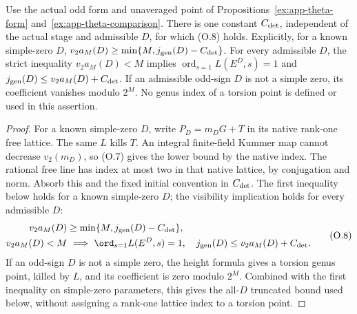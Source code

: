 \begin{proposition}\label{ex:app-visibility}
Use the actual odd form and unaveraged point of
Propositions~\ref{ex:app-theta-form} and~\ref{ex:app-theta-comparison}.
There is one constant $C_{\rm det}$, independent of the actual stage
and admissible $D$, for which (O.8) holds. Explicitly, for a known
simple-zero $D$,
$v_2a_M(D)\ge\min\{M,j_{\rm gen}(D)-C_{\rm det}\}$.
For every admissible $D$, the strict inequality $v_2a_M(D)<M$
implies $\operatorname{ord}_{s=1}L(E^D,s)=1$ and
$j_{\rm gen}(D)\le v_2a_M(D)+C_{\rm det}$.
If an admissible odd-sign $D$ is not a simple zero, its coefficient
vanishes modulo $2^M$. No genus index of a torsion point is defined
or used in this assertion.
\end{proposition}
\begin{proof}\leavevmode
For a known simple-zero $D$, write $P_D=m_DG+T$ in its native
rank-one free lattice. The same $L$ kills $T$.
An integral finite-field Kummer map cannot decrease
$v_2(m_D)$, so (O.7) gives the lower bound by the native index.
The rational free line has index at most two in that native
lattice, by conjugation and norm. Absorb this and the fixed
initial convention in $C_{\rm det}$. The first inequality below
holds for a known simple-zero $D$; the visibility implication holds
for every admissible $D$:
\[
 \begin{split}
 v_2a_M(D)&\ge\min\{M,j_{\rm gen}(D)-C_{\rm det}\},\\
 v_2a_M(D)<M&\ \Longrightarrow\
  \ord_{s=1}L(E^D,s)=1,\quad
       j_{\rm gen}(D)\le v_2a_M(D)+C_{\rm det}.
 \end{split}                                                    \tag{O.8}
\]
If an odd-sign $D$ is not a simple zero, the height formula gives a
torsion genus point, killed by $L$, and its coefficient is zero
modulo $2^M$. Combined with the first inequality on simple-zero
parameters, this gives the all-$D$ truncated bound used below,
without assigning a rank-one lattice index to a torsion point.
\end{proof}

